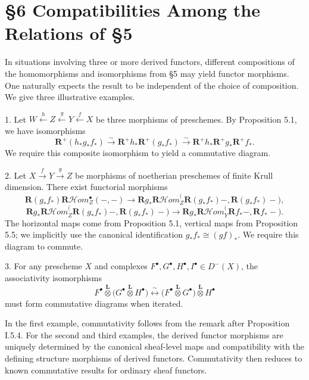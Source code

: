 \setcounter{page}{115}
\section{\S6 Compatibilities Among the Relations of \S5}

In situations involving three or more derived functors, different compositions of the homomorphisms and isomorphisms from \S5 may yield functor morphisms. One naturally expects the result to be independent of the choice of composition. We give three illustrative examples.

1. Let \(W\xleftarrow{h}Z\xleftarrow{g}Y\xleftarrow{f}X\) be three morphisms of preschemes. By Proposition 5.1, we have isomorphisms
\[
\mathbf{R}^+(h_*g_*f_*) \xrightarrow{\sim} \mathbf{R}^+h_*\mathbf{R}^+(g_*f_*)
\xrightarrow{\sim} \mathbf{R}^+h_*\mathbf{R}^+g_*\mathbf{R}^+f_*.
\]
We require this composite isomorphism to yield a commutative diagram.

\setcounter{page}{116}
2. Let \(X\xrightarrow{f}Y\xrightarrow{g}Z\) be morphisms of noetherian preschemes of finite Krull dimension. There exist functorial morphisms
\[
\mathbf{R}(g_*f_*)\mathbf{R}\mathcal{H}\textit{om}_Z^\bullet(-,-)
\to
\mathbf{R}g_*\mathbf{R}\mathcal{H}\textit{om}_Z^\big(\mathbf{R}(g_*f_*)-,\mathbf{R}(g_*f_*)-\big),
\]
\[
\mathbf{R}g_*\mathbf{R}\mathcal{H}\textit{om}_Z^\big(\mathbf{R}(g_*f_*)-,\mathbf{R}(g_*f_*)-\big)
\to
\mathbf{R}g_*\mathbf{R}\mathcal{H}\textit{om}_Y^\big(\mathbf{R}f_*-,\mathbf{R}f_*-\big).
\]
The horizontal maps come from Proposition 5.1, vertical maps from Proposition 5.5; we implicitly use the canonical identification \(g_*f_*\cong(gf)_*\). We require this diagram to commute.

3. For any prescheme \(X\) and complexes \(F^\bullet,G^\bullet,H^\bullet,I^\bullet\in D^-(X)\), the associativity isomorphisms
\[
F^\bullet\stackrel{\mathbf{L}}{\otimes}\big(G^\bullet\stackrel{\mathbf{L}}{\otimes}H^\bullet\big)
\stackrel{\sim}{\longleftrightarrow}
\big(F^\bullet\stackrel{\mathbf{L}}{\otimes}G^\bullet\big)\stackrel{\mathbf{L}}{\otimes}H^\bullet
\]
must form commutative diagrams when iterated.

\setcounter{page}{117}
In the first example, commutativity follows from the remark after Proposition I.5.4.
For the second and third examples, the derived functor morphisms are uniquely determined by the canonical sheaf-level maps and compatibility with the defining structure morphisms of derived functors. Commutativity then reduces to known commutative results for ordinary sheaf functors.

